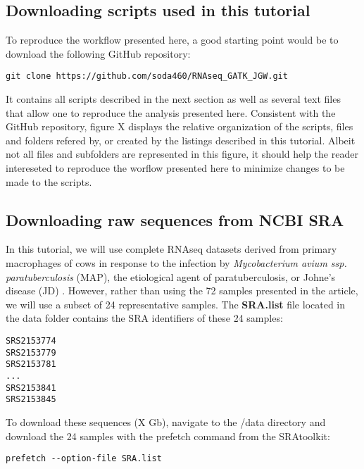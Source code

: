 \subsection{Downloading scripts used in this tutorial}

To reproduce the workflow presented here, a good starting point would be to download the following GitHub repository:

\begin{verbatim}
git clone https://github.com/soda460/RNAseq_GATK_JGW.git
\end{verbatim}

It contains all scripts described in the next section as well as several text files that allow one to reproduce the analysis presented here. Consistent with the GitHub repository, figure X displays the relative organization of the scripts, files and folders refered by, or created by the listings described in this tutorial. Albeit not all files and subfolders are represented in this figure, it should help the reader intereseted to reproduce the worflow presented here to minimize changes to be made to the scripts.





\subsection{Downloading raw sequences from NCBI SRA}

In this tutorial, we will use complete RNAseq datasets derived from primary macrophages of cows  in response to the infection by \textit{Mycobacterium avium ssp. paratuberculosis } (MAP), the etiological agent of paratuberculosis, or Johne’s disease (JD) \cite{Ariel2021}. However, rather than using the 72 samples presented in the article, we will use a subset of 24 representative samples. The \textbf{SRA.list} file located in the data folder contains the SRA identifiers of these 24 samples:

\begin{verbatim}
SRS2153774
SRS2153779
SRS2153781
...
SRS2153841
SRS2153845
\end{verbatim}


To download these sequences (X Gb), navigate to the /data directory and download the 24 samples with the prefetch command from the SRAtoolkit:

\begin{verbatim}
prefetch --option-file SRA.list
\end{verbatim}

